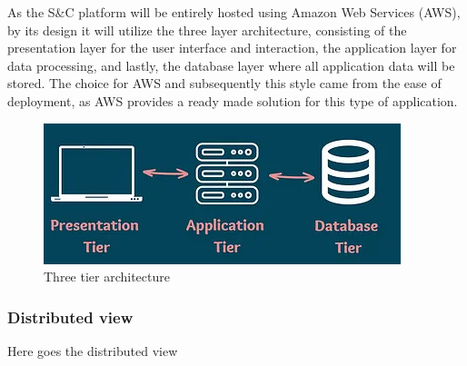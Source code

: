 As the S\&C platform will be entirely hosted using Amazon Web Services (AWS), by its design it will utilize the three layer architecture, consisting of the presentation layer for the user interface and interaction, the application layer for data processing, and lastly, the database layer where all application data will be stored. The choice for AWS and subsequently this style came from the ease of deployment, as AWS provides a ready made solution for this type of application.

\begin{figure}[h]
    \centering
    \includegraphics[width=0.75\linewidth]{DD-Latex//assets/Three tier.jpg}
    \caption{Three tier architecture \cite{MToC_2023}}
    \label{fig:enter-label}
\end{figure}

\subsubsection{Distributed view}
Here goes the distributed view